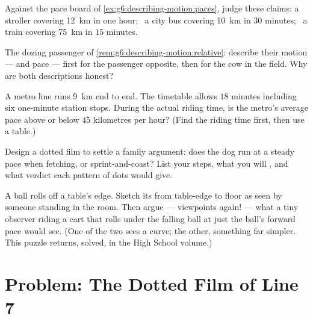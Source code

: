 \begin{exercise}[$\star$]\label{exo:g6:describing-motion:8}
Against the pace board of
\cref{ex:g6:describing-motion:paces}, judge these claims: a
stroller covering \qty{12}{km} in one hour; \ a city bus covering
\qty{10}{km} in $30$ minutes; \ a  train covering
\qty{75}{km} in $15$ minutes.
\end{exercise}

\begin{exercise}[$\star\star$]\label{exo:g6:describing-motion:9}
The dozing passenger of
\cref{rem:g6:describing-motion:relative}: describe their motion
---  and pace --- first for the passenger opposite,
then for the cow in the field. Why are both descriptions honest?
\end{exercise}

\begin{exercise}[$\star\star$]\label{exo:g6:describing-motion:10}
A metro line runs \qty{9}{km} end to end. The timetable allows
$18$ minutes including six one-minute station stops. During the
actual riding time, is the metro's average pace above or below
$45$ kilometres per hour? (Find the riding time first, then use a
table.)
\end{exercise}

\begin{exercise}[$\star\star$]\label{exo:g6:describing-motion:11}
Design a dotted film to settle a family argument: does the dog
run at a steady pace when fetching, or sprint-and-coast? List
your steps, what you will , and what verdict each pattern
of dots would give.
\end{exercise}

\begin{exercise}[$\star\star\star$]\label{exo:g6:describing-motion:12}
A ball rolls off a table's edge. Sketch its  from
table-edge to floor as seen by someone standing in the room.
Then argue --- viewpoints again! --- what  a tiny
observer riding a cart that rolls under the falling ball at just
the ball's forward pace would see. (One of the two sees a curve;
the other, something far simpler. This puzzle returns, solved, in
the High School volume.)
\end{exercise}

\section{Problem: The Dotted Film of Line 7}

